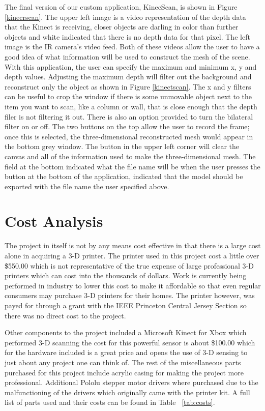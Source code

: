 \documentclass[pdftex,10.5pt]{report}
\begin{document}
The final version of our custom application, KinecScan, is shown in Figure \ref{kinecrscan}. The upper left image is a video representation of the depth data that the Kinect is receiving, closer objects are darling in color than further objects and white indicated that there is no depth data for that pixel. The left image is the IR camera's video feed. Both of these videos allow the user to have a good idea of what information will be used to construct the mesh of the scene. With this application, the user can specify the maximum and minimum x, y and depth values. Adjusting the maximum depth will filter out the background and reconstruct only the object as shown in Figure \ref{kinectscan}. The x and y filters can be useful to crop the window if there is some unmovable object next to the item you want to scan, like a column or wall, that is close enough that the depth filer is not filtering it out. There is also an option provided to turn the bilateral filter on or off. The two buttons on the top allow the user to record the frame; once this is selected, the three-dimensional reconstructed mesh would appear in the bottom grey window. The button in the upper left corner will clear the canvas and all of the information used to make the three-dimensional mesh. The field at the bottom indicated what the file name will be when the user presses the button at the bottom of the application, indicated that the model should be exported with the file name the user specified above. 

\section{Cost Analysis}
The project in itself is not by any means cost effective in that there is a large cost alone in acquiring a 3-D printer. The printer used in this project cost a little over \$550.00 which is not representative of the true expense of large professional 3-D printers which can cost into the thousands of dollars. Work is currently being performed in industry to lower this cost to make it affordable so that even regular consumers may purchase 3-D printers for their homes. \cite{cite9} The printer however, was payed for through a grant with the IEEE Princeton Central Jersey Section so there was no direct cost to the project.

Other components to the project included a Microsoft Kinect for Xbox which performed 3-D scanning the cost for this powerful sensor is about \$100.00 which for the hardware included is a great price and opens the use of 3-D sensing to just about any project one can think of. The rest of the miscellaneous parts purchased for this project include acrylic casing for making the project more professional. Additional Pololu stepper motor drivers where purchased due to the malfunctioning of the drivers which originally came with the printer kit. A full list of parts used and their costs can be found in Table ~\ref{tab:costs}.
\end{document}
